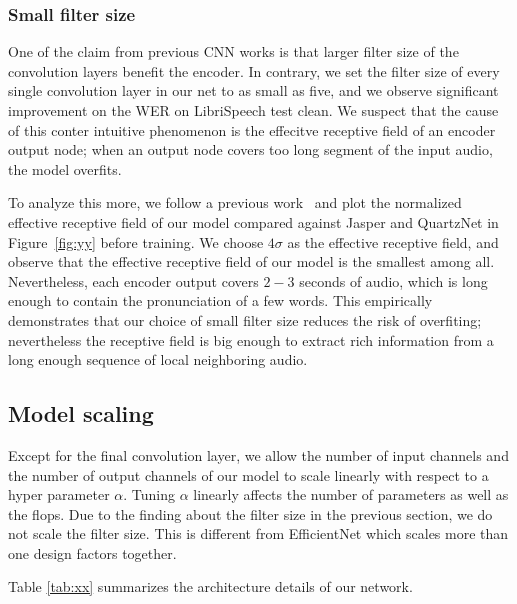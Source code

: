 \subsubsection{Small filter size} One of the claim from previous CNN works \cite{li2019jasper,kriman2019quartznet} is that larger filter size of the convolution layers benefit the encoder. In contrary, we set the filter size of every single convolution layer in our net to as small as five, and we observe significant improvement on the WER on LibriSpeech test clean. We suspect that the cause of this conter intuitive phenomenon is the effecitve receptive field of an encoder output node; when an output node covers too long segment of the input audio, the model overfits.

To analyze this more, we follow a previous work~\cite{luo2016understanding} and plot the normalized effective receptive field of our model compared against Jasper and QuartzNet in Figure~\ref{fig:yy} before training. We choose $4\sigma$ as the effective receptive field, and observe that the effective receptive field of our model is the smallest among all. Nevertheless, each encoder output covers $2-3$ seconds of audio, which is long enough to contain the pronunciation of a few words. This empirically demonstrates that our choice of small filter size reduces the risk of overfiting; nevertheless the receptive field is big enough to extract rich information from a long enough sequence of local neighboring audio.

\subsection{Model scaling}
Except for the final convolution layer, we allow the number of input channels and the number of output channels of our model to scale linearly with respect to a hyper parameter $\alpha$. Tuning $\alpha$ linearly affects the number of parameters as well as the flops. Due to the finding about the filter size in the previous section, we do not scale the filter size. This is different from EfficientNet which scales more than one design factors together.

Table \ref{tab:xx} summarizes the architecture details of our network. 

